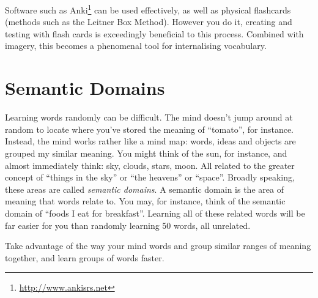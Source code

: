 \documentclass[letterpaper,twoside,openright,11pt,final]{memoir}
\begin{document}
Software such as Anki\footnote{\url{http://www.ankisrs.net}} can be used effectively, as well as physical flashcards (methods such as the Leitner Box Method). However you do it, creating and testing with flash cards is exceedingly beneficial to this process. Combined with imagery, this becomes a phenomenal tool for internalising vocabulary.

\section{Semantic Domains}

Learning words randomly can be difficult. The mind doesn't jump around at random to locate where you've stored the meaning of ``tomato'', for instance. Instead, the mind works rather like a mind map: words, ideas and objects are grouped my similar meaning. You might think of the sun, for instance, and almost immediately think: sky, clouds, stars, moon. All related to the greater concept of ``things in the sky'' or ``the heavens'' or ``space''. Broadly speaking, these areas are called \textit{semantic domains}. A semantic domain is the area of meaning that words relate to. You may, for instance, think of the semantic domain of ``foods I eat for breakfast''. Learning all of these related words will be far easier for you than randomly learning 50 words, all unrelated.

Take advantage of the way your mind words and group similar ranges of meaning together, and learn groups of words faster.

\newpage
\end{document}
